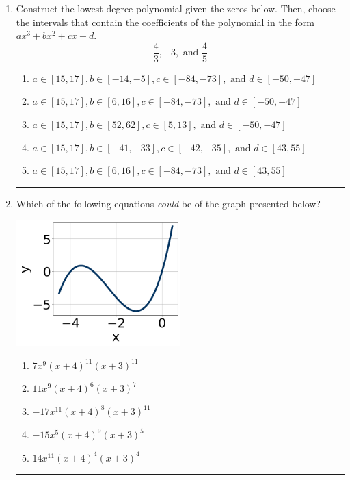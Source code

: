 \documentclass[14pt]{extbook}
\newcommand{\litem}[1]{\item#1\hspace*{-1cm}\rule{\textwidth}{0.4pt}}
\begin{document}
\begin{enumerate}
{\begin{enumerate}[label=\Alph*.]
\end{enumerate} }
\litem{
Construct the lowest-degree polynomial given the zeros below. Then, choose the intervals that contain the coefficients of the polynomial in the form $ax^3+bx^2+cx+d$.\[ \frac{4}{3}, -3, \text{ and } \frac{4}{5} \]\begin{enumerate}[label=\Alph*.]
\item \( a \in [15, 17], b \in [-14, -5], c \in [-84, -73], \text{ and } d \in [-50, -47] \)
\item \( a \in [15, 17], b \in [6, 16], c \in [-84, -73], \text{ and } d \in [-50, -47] \)
\item \( a \in [15, 17], b \in [52, 62], c \in [5, 13], \text{ and } d \in [-50, -47] \)
\item \( a \in [15, 17], b \in [-41, -33], c \in [-42, -35], \text{ and } d \in [43, 55] \)
\item \( a \in [15, 17], b \in [6, 16], c \in [-84, -73], \text{ and } d \in [43, 55] \)

\end{enumerate} }
\litem{
Which of the following equations \textit{could} be of the graph presented below?
\begin{center}
    \includegraphics[width=0.5\textwidth]{../Figures/polyGraphToFunctionC.png}
\end{center}
\begin{enumerate}[label=\Alph*.]
\item \( 7x^{9} (x + 4)^{11} (x + 3)^{11} \)
\item \( 11x^{9} (x + 4)^{6} (x + 3)^{7} \)
\item \( -17x^{11} (x + 4)^{8} (x + 3)^{11} \)
\item \( -15x^{5} (x + 4)^{9} (x + 3)^{5} \)
\item \( 14x^{11} (x + 4)^{4} (x + 3)^{4} \)

\end{enumerate} }
\end{enumerate}
\end{document}
